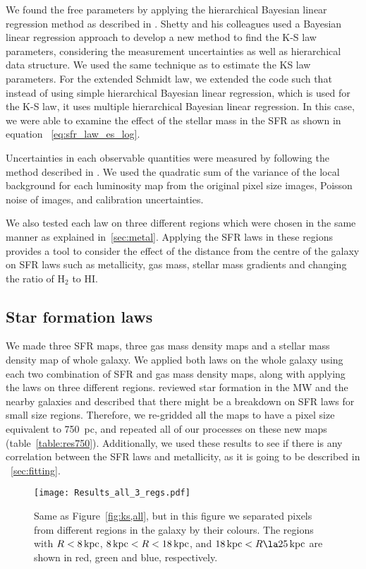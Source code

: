 \documentclass[useAMS,usenatbib]{mn2e}
\newcommand \kpc        {\,{\rm kpc}}
\begin{document}
We found the free parameters by applying the hierarchical Bayesian linear regression method as described in \cite{Shetty13}. Shetty and his colleagues used a Bayesian linear regression approach to develop a new method to find the K-S law parameters, considering the measurement uncertainties as well as hierarchical data structure. We used the same technique as \cite{Shetty13} to estimate the KS law parameters. For the extended Schmidt law, we extended the code such that instead of using  simple hierarchical Bayesian linear regression, which is used for the K-S law, it uses multiple hierarchical Bayesian linear regression. In this case, we were able to examine the effect of the stellar mass in the SFR as shown in equation ~\ref{eq:sfr_law_es_log}. %

Uncertainties in each observable quantities were measured by following the method described in \cite{Kennicutt07}. We used the quadratic sum of the variance of the local background for each luminosity map from the original pixel size images, Poisson noise of images, and calibration uncertainties. 

We also tested each law on three different regions which were chosen in the same manner as explained in~\ref{sec:metal}. Applying the SFR laws in these regions provides a tool to consider the effect of the distance from the centre of the galaxy on SFR laws such as metallicity, gas mass, stellar mass gradients and changing the ratio of H$_2$ to HI. 


\subsection{Star formation laws}
\label{sec: sfl}

We made three SFR maps, three gas mass density maps and a stellar mass density map of whole galaxy. We applied both laws on the whole galaxy using each two combination of SFR and gas mass density maps, along with applying the laws on three different regions.\cite{Kennicutt12} reviewed star formation in the MW and the nearby galaxies and described that there might be a breakdown on SFR laws for small size regions. Therefore, we re-gridded all the maps to have a pixel size equivalent to 750~pc, and repeated all of our processes on these new maps (table~\ref{table:res750}). Additionally, we used these results to see if there is any correlation between the SFR laws and metallicity, as it is going to be described in ~\ref{sec:fitting}.
 
\begin{figure*}
\texttt{[image: Results\_all\_3\_regs.pdf]}
\caption{Same as Figure~\ref{fig:ks,all}, but in this figure we separated pixels from different regions in the galaxy by their colours. The regions with $R< 8\kpc$, $8\kpc < R < 18\kpc$, and $18\kpc < R \la 25\kpc$ are shown in red, green and blue, respectively.}
\label{fig:ks,regs}
\end{figure*}
\end{document}
